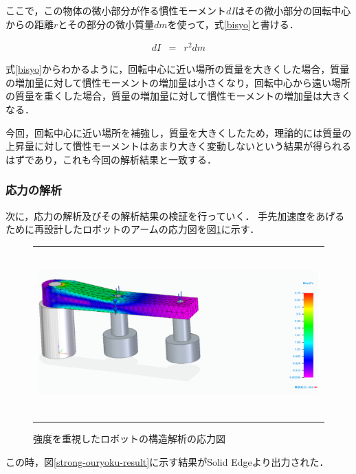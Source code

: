 ここで，この物体の微小部分が作る慣性モーメント\(dI\)はその微小部分の回転中心からの距離\(r\)とその部分の微小質量\(dm\)を使って，式\ref{bisyo}と書ける．

\begin{eqnarray}
  dI &=& r^2 dm 
  \label{bisyo}
\end{eqnarray}

式\ref{bisyo}からわかるように，回転中心に近い場所の質量を大きくした場合，質量の増加量に対して慣性モーメントの増加量は小さくなり，回転中心から遠い場所の質量を重くした場合，質量の増加量に対して慣性モーメントの増加量は大きくなる．

今回，回転中心に近い場所を補強し，質量を大きくしたため，理論的には質量の上昇量に対して慣性モーメントはあまり大きく変動しないという結果が得られるはずであり，これも今回の解析結果と一致する．

\subsubsection{応力の解析}\label{ux5fdcux529bux306eux89e3ux6790}

次に，応力の解析及びその解析結果の検証を行っていく．
手先加速度をあげるために再設計したロボットのアームの応力図を図\ref{strong-ouryoku}に示す．

\begin{figure}[htbp]
  \begin{center}
    \begin{tabular}{c}
      \includegraphics[height=6.5cm]{img/eps/strong-ouryoku.eps}
    \end{tabular}
    \caption{強度を重視したロボットの構造解析の応力図}
    \label{strong-ouryoku}
  \end{center}
\end{figure}

この時，図\ref{strong-ouryoku-result}に示す結果がSolid
Edgeより出力された．


